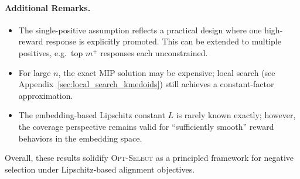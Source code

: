 \vspace{-0.05in}
\paragraph{Additional Remarks.}

\vspace{-0.15in}
\begin{itemize}[leftmargin=1.25em, itemsep=0.5em]
    \item The single-positive assumption reflects a practical design where one high-reward response is explicitly promoted. This can be extended to multiple positives, e.g.\ top \(m^+\) responses each unconstrained.
    \item For large \(n\), the exact MIP solution may be expensive; local search (see Appendix~\ref{sec:local_search_kmedoids}) still achieves a constant-factor approximation.
    \item The embedding-based Lipschitz constant \(L\) is rarely known exactly; however, the coverage perspective remains valid for “sufficiently smooth” reward behaviors in the embedding space.
\end{itemize}

Overall, these results solidify \textsc{Opt-Select} as a principled framework for negative selection under Lipschitz-based alignment objectives.
